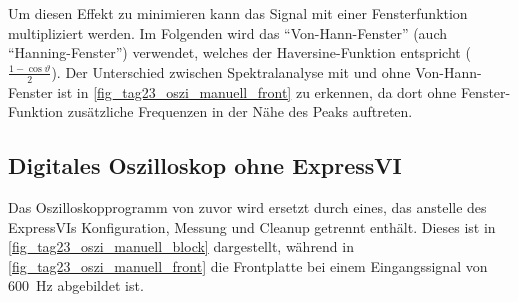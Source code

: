 \documentclass[
a4paper,
12pt,
pagesize,
ngerman
]{scrartcl}
\begin{document}
	Um diesen Effekt zu minimieren kann das Signal mit einer Fensterfunktion multipliziert werden. %
	Im Folgenden wird das \enquote{Von-Hann-Fenster} (auch \enquote{Hanning-Fenster}) verwendet, welches der Haversine-Funktion entspricht ($\frac{1-\cos \vartheta}{2} $). %
	Der Unterschied zwischen Spektralanalyse mit und ohne Von-Hann-Fenster ist in \cref{fig_tag23_oszi_manuell_front} zu erkennen, da dort ohne Fenster-Funktion zusätzliche Frequenzen in der Nähe des Peaks auftreten.
	

	\subsection{Digitales Oszilloskop ohne ExpressVI} %
	Das Oszilloskopprogramm von zuvor wird ersetzt durch eines, das anstelle des ExpressVIs Konfiguration, Messung und Cleanup getrennt enthält.
	Dieses ist in \cref{fig_tag23_oszi_manuell_block} dargestellt, während in \cref{fig_tag23_oszi_manuell_front} die Frontplatte bei einem Eingangssignal von \SI{600}{\hertz} abgebildet ist.
	
\end{document}
